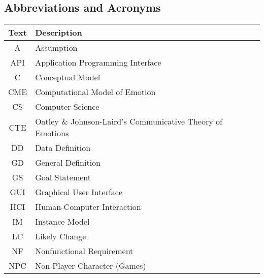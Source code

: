 \subsection{Abbreviations and Acronyms}

\begin{center}

    \renewcommand{\arraystretch}{1.2}
    \begin{tabular}{c l}

        \toprule
        \textbf{Text} & \textbf{Description} \\
        \midrule

        \rowcolor[gray]{0.9}A & Assumption \\

        API & Application Programming Interface \\

        \rowcolor[gray]{0.9}C & Conceptual Model \\

        CME & Computational Model of Emotion \\

        \rowcolor[gray]{0.9}CS & Computer Science \\

        CTE & Oatley \& Johnson-Laird's Communicative Theory of Emotions \\

        \rowcolor[gray]{0.9}DD & Data Definition \\

        GD & General Definition \\

        \rowcolor[gray]{0.9}GS & Goal Statement \\

        GUI & Graphical User Interface \\

        \rowcolor[gray]{0.9}HCI & Human-Computer Interaction \\

        IM & Instance Model \\

        \rowcolor[gray]{0.9}LC & Likely Change \\

        NF & Nonfunctional Requirement \\

        \rowcolor[gray]{0.9}NPC & Non-Player Character (Games) \\


\end{tabular}
\end{center}
